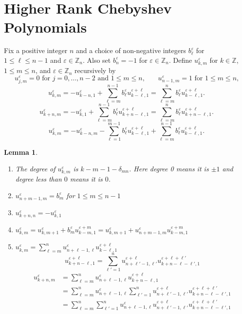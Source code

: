 \documentclass{amsart}
\newtheorem{lemma}[theorem]{Lemma}
\numberwithin{theorem}{section}
\newcommand{\ZZ}{\mathbb{Z}}
\begin{document}
\section{Higher Rank Chebyshev Polynomials}
  Fix a positive integer $n$ and a choice of non-negative integers $b_\ell^\varepsilon$ for $1\le \ell\le n-1$ and $\varepsilon\in\ZZ_n$.
  Also set $b_n^\varepsilon=-1$ for $\varepsilon\in\ZZ_n$.
  Define $u_{k,m}^\varepsilon$ for $k\in\ZZ$, $1\le m\le n$, and $\varepsilon\in\ZZ_n$ recursively by
  \[u_{j,m}^\varepsilon = 0 \text{ for $j=0,\ldots,n-2$ and $1\le m\le n$,} \qquad u_{n-1,m}^\varepsilon = 1 \text{ for $1\le m\le n$,}\]
  \[u_{k,m}^\varepsilon = -u_{k-n,1}^\varepsilon+\sum\limits_{\ell=m}^{n-1} b_\ell^\varepsilon u_{k-\ell,1}^{\varepsilon+\ell} = \sum\limits_{\ell=m}^n b_\ell^\varepsilon u_{k-\ell,1}^{\varepsilon+\ell}.\]
  \[u_{k+n,m}^\varepsilon = -u_{k,1}^\varepsilon+\sum\limits_{\ell=m}^{n-1} b_\ell^\varepsilon u_{k+n-\ell,1}^{\varepsilon+\ell} = \sum\limits_{\ell=m}^n b_\ell^\varepsilon u_{k+n-\ell,1}^{\varepsilon+\ell}.\]
  \[u_{k,m}^\varepsilon = -u_{k-n,m}^\varepsilon-\sum\limits_{\ell=1}^{m-1} b_\ell^\varepsilon u_{k-\ell,1}^{\varepsilon+\ell}+\sum\limits_{\ell=m}^{n-1} b_\ell^\varepsilon u_{k-\ell,1}^{\varepsilon+\ell}.\]

  \begin{lemma}
    \mbox{}
    \begin{enumerate}
      \item The degree of $u_{k,m}^\varepsilon$ is $k-m-1-\delta_{mn}$.
        Here degree 0 means it is $\pm 1$ and degree less than $0$ means it is $0$.
      \item $u_{n+m-1,m}^\varepsilon=b_m^\varepsilon$ for $1\le m\le n-1$
      \item $u_{k+n,n}^\varepsilon = -u_{k,1}^\varepsilon$
      \item $u_{k,m}^\varepsilon = u_{k,m+1}^\varepsilon + b_m^\varepsilon u_{k-m,1}^{\varepsilon+m} = u_{k,m+1}^\varepsilon + u_{n+m-1,m}^\varepsilon u_{k-m,1}^{\varepsilon+m}$
      \item $u_{k,m}^\varepsilon = \sum\limits_{\ell=m}^n u_{n+\ell-1,\ell}^\varepsilon u_{k-\ell,1}^{\varepsilon+\ell}$
        \[u_{k+n-\ell,1}^{\varepsilon+\ell} = \sum\limits_{\ell'=1}^n u_{n+\ell'-1,\ell'}^{\varepsilon+\ell} u_{k+n-\ell-\ell',1}^{\varepsilon+\ell+\ell'}\]
        \begin{align*}
          u_{k+n,m}^\varepsilon 
          &=
          \sum\limits_{\ell=m}^n u_{n+\ell-1,\ell}^\varepsilon u_{k+n-\ell,1}^{\varepsilon+\ell} \\
          &=
          \sum\limits_{\ell=m}^n u_{n+\ell-1,\ell}^\varepsilon \sum\limits_{\ell'=1}^n u_{n+\ell'-1,\ell'}^{\varepsilon+\ell} u_{k+n-\ell-\ell',1}^{\varepsilon+\ell+\ell'} \\
          &=
          \sum\limits_{\ell=m}^n \sum\limits_{\ell'=1}^n u_{n+\ell-1,\ell}^\varepsilon u_{n+\ell'-1,\ell'}^{\varepsilon+\ell} u_{k+n-\ell-\ell',1}^{\varepsilon+\ell+\ell'} \\
        \end{align*}
    \end{enumerate}
  \end{lemma}
\end{document}
